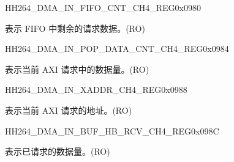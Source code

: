 \begin{register}{H}{H264\_DMA\_IN\_FIFO\_CNT\_CH4\_REG}{0x0980}\label{regdesc:H264DMAINFIFOCNTCH4REG}
%
%
\regnewline%
\begin{regdesc}\begin{reglist}
\label{fielddesc:H264DMAINCMDFIFOINFIFOCNTCH4}\item [H264\_DMA\_IN\_CMDFIFO\_INFIFO\_CNT\_CH4] 表示 FIFO 中剩余的请求数据。(RO)
\end{reglist}\end{regdesc}
\end{register}


\begin{register}{H}{H264\_DMA\_IN\_POP\_DATA\_CNT\_CH4\_REG}{0x0984}\label{regdesc:H264DMAINPOPDATACNTCH4REG}
%
%
\regnewline%
\begin{regdesc}\begin{reglist}
\label{fielddesc:H264DMAINCMDFIFOPOPDATACNTCH4}\item [H264\_DMA\_IN\_CMDFIFO\_POP\_DATA\_CNT\_CH4] 表示当前 AXI 请求中的数据量。(RO)
\end{reglist}\end{regdesc}
\end{register}


\begin{register}{H}{H264\_DMA\_IN\_XADDR\_CH4\_REG}{0x0988}\label{regdesc:H264DMAINXADDRCH4REG}
%
\regnewline%
\begin{regdesc}\begin{reglist}
\label{fielddesc:H264DMAINCMDFIFOXADDRCH4}\item [H264\_DMA\_IN\_CMDFIFO\_XADDR\_CH4] 表示当前 AXI 请求的地址。(RO)
\end{reglist}\end{regdesc}
\end{register}


\begin{register}{H}{H264\_DMA\_IN\_BUF\_HB\_RCV\_CH4\_REG}{0x098C}\label{regdesc:H264DMAINBUFHBRCVCH4REG}
%
%
\regnewline%
\begin{regdesc}\begin{reglist}
\label{fielddesc:H264DMAINCMDFIFOBUFHBRCVCH4}\item [H264\_DMA\_IN\_CMDFIFO\_BUF\_HB\_RCV\_CH4] 表示已请求的数据量。(RO)
\end{reglist}\end{regdesc}
\end{register}






